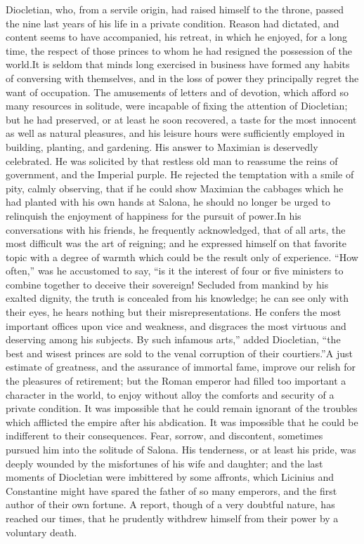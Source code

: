 Diocletian, who, from a servile origin, had raised himself to the
throne, passed the nine last years of his life in a private
condition. Reason had dictated, and content seems to have
accompanied, his retreat, in which he enjoyed, for a long time,
the respect of those princes to whom he had resigned the
possession of the world.\footnotemark[111] It is seldom that minds long
exercised in business have formed any habits of conversing with
themselves, and in the loss of power they principally regret the
want of occupation. The amusements of letters and of devotion,
which afford so many resources in solitude, were incapable of
fixing the attention of Diocletian; but he had preserved, or at
least he soon recovered, a taste for the most innocent as well as
natural pleasures, and his leisure hours were sufficiently
employed in building, planting, and gardening. His answer to
Maximian is deservedly celebrated. He was solicited by that
restless old man to reassume the reins of government, and the
Imperial purple. He rejected the temptation with a smile of pity,
calmly observing, that if he could show Maximian the cabbages
which he had planted with his own hands at Salona, he should no
longer be urged to relinquish the enjoyment of happiness for the
pursuit of power.\footnotemark[112] In his conversations with his friends, he
frequently acknowledged, that of all arts, the most difficult was
the art of reigning; and he expressed himself on that favorite
topic with a degree of warmth which could be the result only of
experience. “How often,” was he accustomed to say, “is it the
interest of four or five ministers to combine together to deceive
their sovereign! Secluded from mankind by his exalted dignity,
the truth is concealed from his knowledge; he can see only with
their eyes, he hears nothing but their misrepresentations. He
confers the most important offices upon vice and weakness, and
disgraces the most virtuous and deserving among his subjects. By
such infamous arts,” added Diocletian, “the best and wisest
princes are sold to the venal corruption of their courtiers.”\footnotemark[113]
A just estimate of greatness, and the assurance of immortal fame,
improve our relish for the pleasures of retirement; but the Roman
emperor had filled too important a character in the world, to
enjoy without alloy the comforts and security of a private
condition. It was impossible that he could remain ignorant of the
troubles which afflicted the empire after his abdication. It was
impossible that he could be indifferent to their consequences.
Fear, sorrow, and discontent, sometimes pursued him into the
solitude of Salona. His tenderness, or at least his pride, was
deeply wounded by the misfortunes of his wife and daughter; and
the last moments of Diocletian were imbittered by some affronts,
which Licinius and Constantine might have spared the father of so
many emperors, and the first author of their own fortune. A
report, though of a very doubtful nature, has reached our times,
that he prudently withdrew himself from their power by a
voluntary death.\footnotemark[114]

